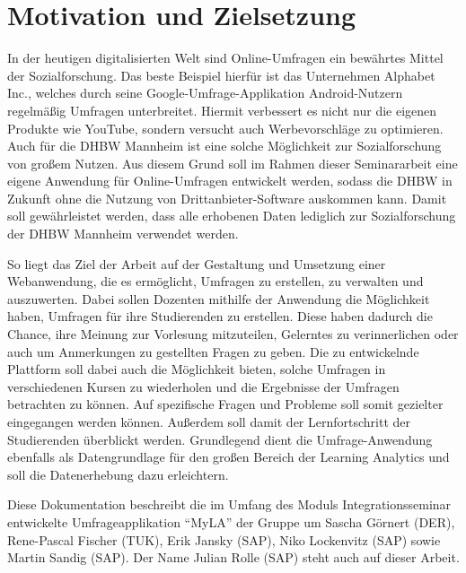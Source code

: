 \section{Motivation und Zielsetzung}

In der heutigen digitalisierten Welt sind Online-Umfragen ein bewährtes Mittel der Sozialforschung.
Das beste Beispiel hierfür ist das Unternehmen Alphabet Inc., welches durch seine Google-Umfrage-Applikation Android-Nutzern regelmäßig Umfragen unterbreitet. 
Hiermit verbessert es nicht nur die eigenen Produkte wie YouTube, sondern versucht auch Werbevorschläge zu optimieren.
Auch für die \acs{DHBW} Mannheim ist eine solche Möglichkeit zur Sozialforschung von großem Nutzen.
Aus diesem Grund soll im Rahmen dieser Seminararbeit eine eigene Anwendung für Online-Umfragen entwickelt werden, sodass die \acs{DHBW} in Zukunft ohne die Nutzung von Drittanbieter-Software auskommen kann.
Damit soll gewährleistet werden, dass alle erhobenen Daten lediglich zur Sozialforschung der \acs{DHBW} Mannheim verwendet werden.

So liegt das Ziel der Arbeit auf der Gestaltung und Umsetzung einer Webanwendung, die es ermöglicht, Umfragen zu erstellen, zu verwalten und auszuwerten.
Dabei sollen Dozenten mithilfe der Anwendung die Möglichkeit haben, Umfragen für ihre Studierenden zu erstellen.
Diese haben dadurch die Chance, ihre Meinung zur Vorlesung mitzuteilen, Gelerntes zu verinnerlichen oder auch um Anmerkungen zu gestellten Fragen zu geben.
Die zu entwickelnde Plattform soll dabei auch die Möglichkeit bieten, solche Umfragen in verschiedenen Kursen zu wiederholen und die Ergebnisse der Umfragen betrachten zu können.
Auf spezifische Fragen und Probleme soll somit gezielter eingegangen werden können.
Außerdem soll damit der Lernfortschritt der Studierenden überblickt werden.
Grundlegend dient die Umfrage-Anwendung ebenfalls als Datengrundlage für den großen Bereich der Learning Analytics und soll die Datenerhebung dazu erleichtern.


Diese Dokumentation beschreibt die im Umfang des Moduls Integrationsseminar entwickelte Umfrageapplikation \enquote{MyLA} der Gruppe um Sascha Görnert (DER), Rene-Pascal Fischer (TUK), Erik Jansky (SAP), Niko Lockenvitz (SAP) sowie Martin Sandig (SAP).
Der Name Julian Rolle (SAP) steht auch auf dieser Arbeit.
